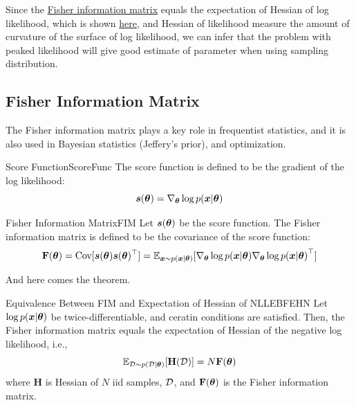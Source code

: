 \documentclass{report}
\begin{document}
                Since the \hyperref[defn:FIM]{Fisher information matrix} equals the expectation of Hessian of log likelihood,
                which is shown \hyperref[thm:EBFEHN]{here},
                and Hessian of likelihood measure the amount of curvature of the surface of log likelihood,
                we can infer that the problem with peaked likelihood will give good estimate of parameter when using sampling distribution.

        \subsection{Fisher Information Matrix}
        The Fisher information matrix plays a key role in frequentist statistics,
        and it is also used in Bayesian statistics (Jeffery's prior), and optimization.

            \begin{defn}{Score Function}{ScoreFunc}
            The score function is defined to be the gradient of the log likelihood:
            \[
            \boldsymbol{s}(\boldsymbol{\theta}) = \nabla_{\boldsymbol{\theta}}\log{p(\boldsymbol{x}|\boldsymbol{\theta})}
            \]
            \end{defn}
            
            \begin{defn}{Fisher Information Matrix}{FIM}
            Let $\boldsymbol{s}(\boldsymbol{\theta})$ be the score function. 
            The Fisher information matrix is defined to be the covariance of the score function:
            \[
            \textbf{F}(\boldsymbol{\theta})=\text{Cov}[\boldsymbol{s}(\boldsymbol{\theta}) \boldsymbol{s}(\boldsymbol{\theta})^{\top}]
            =\mathbb{E}_{\boldsymbol{x} \sim p(\boldsymbol{x}|\boldsymbol{\theta})}[\nabla_{\boldsymbol{\theta}}\log{p(\boldsymbol{x}|\boldsymbol{\theta})}\nabla_{\boldsymbol{\theta}}\log{p(\boldsymbol{x}|\boldsymbol{\theta})}^{\top}]
            \]
            \end{defn}

            And here comes the theorem.

            \begin{thm}{Equivalence Between FIM and Expectation of Hessian of NLL}{EBFEHN}
            Let $\log{p(\boldsymbol{x}|\boldsymbol{\theta})}$ be twice-differentiable, and ceratin conditions are satisfied.
            Then, the Fisher information matrix equals the expectation of Hessian of the negative log likelihood,
            i.e.,
            \[
            \mathbb{E}_{\mathcal D \sim p(\mathcal D|\boldsymbol{\theta})}[\textbf{H}(\mathcal D)] = N\textbf{F}(\boldsymbol{\theta})
            \]
            where $\textbf{H}$ is Hessian of $N$ iid samples, $\mathcal D$, and $\textbf{F}(\boldsymbol{\theta})$ is the Fisher information matrix.
            \end{thm}
\end{document}
